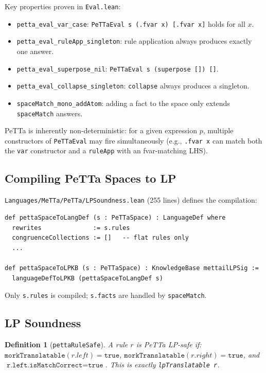 \documentclass[]{article}
\newtheorem{definition}[theorem]{Definition}
\newcommand{\code}[1]{\texttt{#1}}
\newcommand{\PeTTa}{\textup{PeTTa}}
\begin{document}
Key properties proven in \code{Eval.lean}:
\begin{itemize}
\item \code{petta\_eval\_var\_case}: \code{PeTTaEval s (.fvar x) [.fvar x]} holds for all $x$.
\item \code{petta\_eval\_ruleApp\_singleton}: rule application always produces exactly one answer.
\item \code{petta\_eval\_superpose\_nil}: \code{PeTTaEval s (superpose []) []}.
\item \code{petta\_eval\_collapse\_singleton}: \code{collapse} always produces a singleton.
\item \code{spaceMatch\_mono\_addAtom}: adding a fact to the space only extends \code{spaceMatch} answers.
\end{itemize}

\PeTTa{} is inherently non-deterministic: for a given expression $p$, multiple
constructors of \code{PeTTaEval} may fire simultaneously (e.g., \code{.fvar x}
can match both the \code{var} constructor and a \code{ruleApp} with an
fvar-matching LHS).

\subsection{Compiling \PeTTa{} Spaces to LP}

\code{Languages/MeTTa/PeTTa/LPSoundness.lean} (255 lines) defines the compilation:

\begin{lstlisting}[language=lean]
def pettaSpaceToLangDef (s : PeTTaSpace) : LanguageDef where
  rewrites              := s.rules
  congruenceCollections := []   -- flat rules only
  ...

def pettaSpaceToLPKB (s : PeTTaSpace) : KnowledgeBase mettailLPSig :=
  languageDefToLPKB (pettaSpaceToLangDef s)
\end{lstlisting}

Only \code{s.rules} is compiled; \code{s.facts} are handled by \code{spaceMatch}.

\subsection{LP Soundness}

\begin{definition}[\code{pettaRuleSafe}]
A rule $r$ is \emph{PeTTa LP-safe} if:
$\code{morkTranslatable}(r.left) = \code{true}$,
$\code{morkTranslatable}(r.right) = \code{true}$, and
$\code{r.left.isMatchCorrect} = \code{true}$.
This is exactly \code{lpTranslatable r}.
\end{definition}
\end{document}
